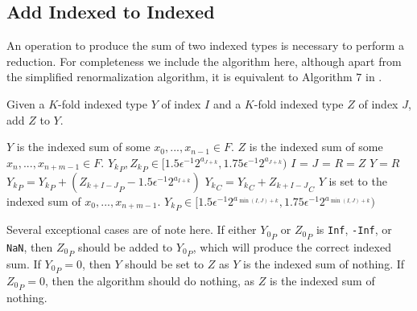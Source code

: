\subsection{Add Indexed to Indexed}
    \label{sec:primitiveops_addindexedtoindexed}
    An operation to produce the sum of two indexed types is necessary to
    perform a reduction. For completeness we include the algorithm here,
    although apart from the simplified renormalization algorithm, it is
    equivalent to Algorithm $7$ in \cite{repsum}.

    \begin{samepage}
    \begin{alg}
      Given a $K$-fold indexed type $Y$ of index $I$ and a $K$-fold indexed
      type $Z$ of index $J$, add $Z$ to $Y$.
      \begin{algorithmic}[1]
        \Require
          \Statex $Y$ is the indexed sum of some $x_0, ..., x_{n - 1} \in F$.
          \Statex $Z$ is the indexed sum of some $x_n, ..., x_{n + m - 1} \in F$.
          \Statex ${Y_k}_P, {Z_k}_P \in [1.5  \epsilon^{-1} 2^{a_{J + k}}, 1.75  \epsilon^{-1} 2^{a_{J + k}})$
          \State $I$ = 
          \State $J$ = 
            \State $R = Z$
            \State {}
            \State $Y = R$
            \State \Return
          \EndIf
           \label{alg:addindexedtoindexed:beginfor}
            \State ${Y_{k}}_P = {Y_{k}}_P + ({Z_{k + I-J}}_P - 1.5 \epsilon^{-1}  2^{a_{I+k}})$\label{alg:addindexedtoindexed:pri}
            \State ${Y_{k}}_C = {Y_{k}}_C + {Z_{k + I - J}}_C$\label{alg:addindexedtoindexed:car}
          \EndFor
          \State {}\label{alg:addindexedtoindexed:renorm}
        \EndFunction
        \Ensure
          \Statex $Y$ is set to the indexed sum of $x_0, ..., x_{n + m - 1}$.
          \Statex ${Y_k}_P \in [1.5  \epsilon^{-1} 2^{a_{\min(I, J) + k}}, 1.75  \epsilon^{-1} 2^{a_{\min(I, J) + k}})$
      \end{algorithmic}
      \label{alg:addindexedtoindexed}
    \end{alg}
    \end{samepage}
    Several exceptional cases are of note here. If either ${Y_0}_P$ or ${Z_0}_P$ is \texttt{Inf}, \texttt{-Inf}, or \texttt{NaN}, then ${Z_0}_P$ should be added to ${Y_0}_P$, which will produce the correct indexed sum. If ${Y_0}_P = 0$, then $Y$ should be set to $Z$ as $Y$ is the indexed sum of nothing. If ${Z_0}_P = 0$, then the algorithm should do nothing, as $Z$ is the indexed sum of nothing.

